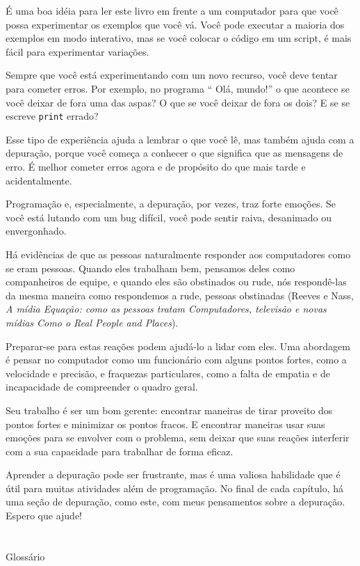 \documentclass[10pt]{book}
\begin{document}
É uma boa idéia para ler este livro em frente a um computador para que você possa
experimentar os exemplos que você vá. Você pode executar a maioria dos exemplos em
modo interativo, mas se você colocar o código em um script, é mais fácil
para experimentar variações.

Sempre que você está experimentando com um novo recurso, você deve tentar
para cometer erros. Por exemplo, no programa `` Olá, mundo!''
o que acontece se você deixar de fora uma das aspas? O que
se você deixar de fora os dois? E se se escreve {\tt print} errado?

Esse tipo de experiência ajuda a lembrar o que você lê, mas também ajuda
com a depuração, porque você começa a conhecer o que significa que as mensagens de erro.
É melhor cometer erros agora e de propósito do que mais tarde
e acidentalmente.

Programação e, especialmente, a depuração, por vezes, traz forte
emoções. Se você está lutando com um bug difícil, você pode
sentir raiva, desanimado ou envergonhado.

Há evidências de que as pessoas naturalmente responder aos computadores como se
eram pessoas. Quando eles trabalham bem, pensamos
deles como companheiros de equipe, e quando eles são obstinados ou rude, nós
respondê-las da mesma maneira como respondemos a rude,
pessoas obstinadas (Reeves e Nass, {\it A mídia
    Equação: como as pessoas tratam Computadores, televisão e novas mídias
    Como o Real People and Places}).

Preparar-se para estas reações podem ajudá-lo a lidar com eles.
Uma abordagem é pensar no computador como um funcionário com
alguns pontos fortes, como a velocidade e precisão, e
fraquezas particulares, como a falta de empatia e de incapacidade
de compreender o quadro geral.

Seu trabalho é ser um bom gerente: encontrar maneiras de tirar proveito
dos pontos fortes e minimizar os pontos fracos. E encontrar maneiras
usar suas emoções para se envolver com o problema,
sem deixar que suas reações interferir com a sua capacidade
para trabalhar de forma eficaz.

Aprender a depuração pode ser frustrante, mas é uma valiosa habilidade
que é útil para muitas atividades além de programação. No
final de cada capítulo, há uma seção de depuração, como este,
com meus pensamentos sobre a depuração. Espero que ajude!


\section{} Glossário
\end{document}
